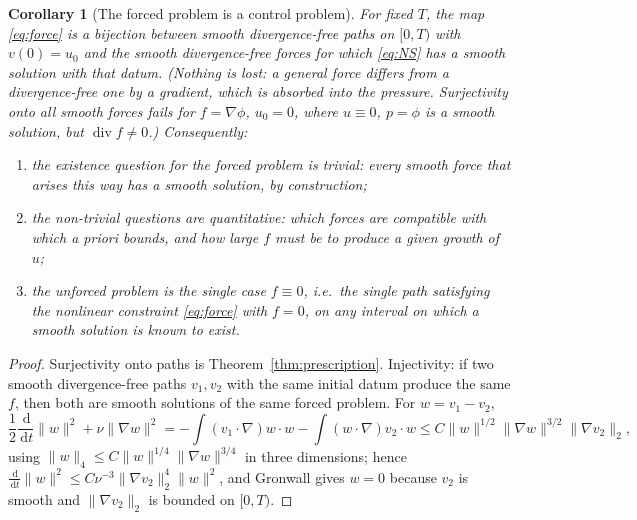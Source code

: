 \documentclass[11pt]{article}
\newtheorem{corollary}[theorem]{Corollary}
\theoremstyle{remark}
\newcommand{\dd}{\,\mathrm{d}}
\newcommand{\norm}[1]{\lVert #1\rVert}
\newcommand{\Div}{\operatorname{div}}
\begin{document}
\begin{corollary}[The forced problem is a control problem]\label{cor:control}
For fixed $T$, the map \eqref{eq:force} is a bijection between smooth divergence-free paths on
$[0,T)$ with $v(0)=u_0$ and the smooth \emph{divergence-free} forces for which \eqref{eq:NS}
has a smooth solution with that datum. (Nothing is lost: a general force differs from a
divergence-free one by a gradient, which is absorbed into the pressure. Surjectivity onto all
smooth forces fails for $f=\nabla\phi$, $u_0=0$, where $u\equiv0$, $p=\phi$ is a smooth
solution, but $\Div f\ne0$.) Consequently:
\begin{enumerate}[label=(\roman*),leftmargin=*]
\item the \emph{existence} question for the forced problem is trivial: every smooth force that
      arises this way has a smooth solution, by construction;
\item the non-trivial questions are quantitative: which forces are compatible with which
      \emph{a priori} bounds, and how large $f$ must be to produce a given growth of $u$;
\item the unforced problem is the single case $f\equiv0$, i.e.\ the single path satisfying the
      nonlinear constraint \eqref{eq:force} with $f=0$, on any interval on which a smooth
      solution is known to exist.
\end{enumerate}
\end{corollary}

\begin{proof}
Surjectivity onto paths is Theorem~\ref{thm:prescription}. Injectivity: if two smooth
divergence-free paths $v_1,v_2$ with the same initial datum produce the same $f$, then both
are smooth solutions of the same forced problem. For $w=v_1-v_2$,
\[
\frac12\frac{\dd}{\dd t}\norm{w}^2+\nu\norm{\nabla w}^2
=-\int(v_1\cdot\nabla)w\cdot w-\int(w\cdot\nabla)v_2\cdot w
\le C\norm{w}^{1/2}\norm{\nabla w}^{3/2}\norm{\nabla v_2}_2 ,
\]
using $\norm{w}_4\le C\norm{w}^{1/4}\norm{\nabla w}^{3/4}$ in three dimensions; hence
$\frac{\dd}{\dd t}\norm{w}^2\le C\nu^{-3}\norm{\nabla v_2}_2^4\norm{w}^2$, and Gronwall gives
$w=0$ because $v_2$ is smooth and $\norm{\nabla v_2}_2$ is bounded on $[0,T)$.
\end{proof}
\end{document}
